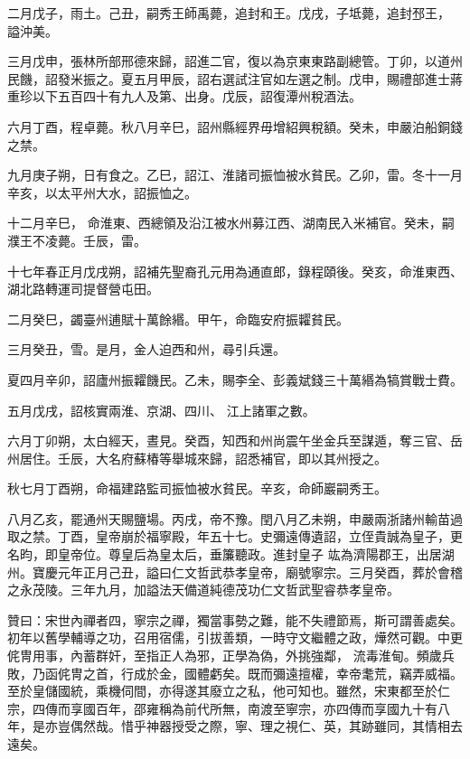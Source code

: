 \begin{pinyinscope}
 二月戊子，雨土。己丑，嗣秀王師禹薨，追封和王。戊戌，子坻薨，追封邳王，
 謚沖美。



 三月戊申，張林所部邢德來歸，詔進二官，復以為京東東路副總管。丁卯，以道州民饑，詔發米振之。夏五月甲辰，詔右選試注官如左選之制。戊申，賜禮部進士蔣重珍以下五百四十有九人及第、出身。戊辰，詔復潭州稅酒法。



 六月丁酉，程卓薨。秋八月辛巳，詔州縣經界毋增紹興稅額。癸未，申嚴泊船銅錢之禁。



 九月庚子朔，日有食之。乙巳，詔江、淮諸司振恤被水貧民。乙卯，雷。冬十一月辛亥，以太平州大水，詔振恤之。



 十二月辛巳，
 命淮東、西總領及沿江被水州募江西、湖南民入米補官。癸未，嗣濮王不凌薨。壬辰，雷。



 十七年春正月戊戌朔，詔補先聖裔孔元用為通直郎，錄程頤後。癸亥，命淮東西、湖北路轉運司提督營屯田。



 二月癸巳，蠲臺州逋賦十萬餘緡。甲午，命臨安府振糶貧民。



 三月癸丑，雪。是月，金人迫西和州，尋引兵還。



 夏四月辛卯，詔廬州振糶饑民。乙未，賜李全、彭義斌錢三十萬緡為犒賞戰士費。



 五月戊戌，詔核實兩淮、京湖、四川、
 江上諸軍之數。



 六月丁卯朔，太白經天，晝見。癸酉，知西和州尚震午坐金兵至謀遁，奪三官、岳州居住。壬辰，大名府蘇椿等舉城來歸，詔悉補官，即以其州授之。



 秋七月丁酉朔，命福建路監司振恤被水貧民。辛亥，命師巖嗣秀王。



 八月乙亥，罷通州天賜鹽場。丙戌，帝不豫。閏八月乙未朔，申嚴兩浙諸州輸苗過取之禁。丁酉，皇帝崩於福寧殿，年五十七。史彌遠傳遺詔，立侄貴誠為皇子，更名昀，即皇帝位。尊皇后為皇太后，垂簾聽政。進封皇子
 竑為濟陽郡王，出居湖州。寶慶元年正月己丑，謚曰仁文哲武恭孝皇帝，廟號寧宗。三月癸酉，葬於會稽之永茂陵。三年九月，加謚法天備道純德茂功仁文哲武聖睿恭孝皇帝。



 贊曰：宋世內禪者四，寧宗之禪，獨當事勢之難，能不失禮節焉，斯可謂善處矣。初年以舊學輔導之功，召用宿儒，引拔善類，一時守文繼體之政，燁然可觀。中更侂冑用事，內蓄群奸，至指正人為邪，正學為偽，外挑強鄰，
 流毒淮甸。頻歲兵敗，乃函侂冑之首，行成於金，國體虧矣。既而彌遠擅權，幸帝耄荒，竊弄威福。至於皇儲國統，乘機伺間，亦得遂其廢立之私，他可知也。雖然，宋東都至於仁宗，四傳而享國百年，邵雍稱為前代所無，南渡至寧宗，亦四傳而享國九十有八年，是亦豈偶然哉。惜乎神器授受之際，寧、理之視仁、英，其跡雖同，其情相去遠矣。



\end{pinyinscope}